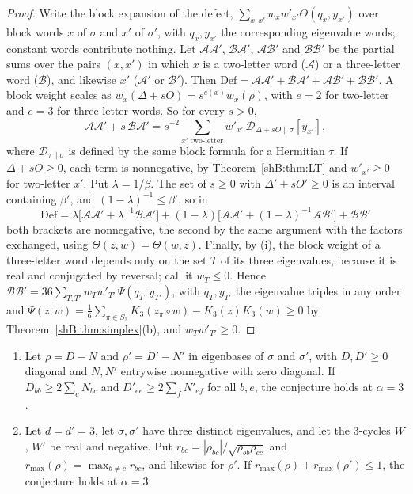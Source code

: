 \begin{proof}
Write the block expansion of the defect, $\sum_{x,x'}w_xw'_{x'}\Theta(q_x,y_{x'})$ over block words $x$ of $\sigma$ and $x'$ of $\sigma'$, with $q_x,y_{x'}$ the corresponding eigenvalue words; constant words contribute nothing. Let $\mathcal A\mathcal A'$, $\mathcal B\mathcal A'$, $\mathcal A\mathcal B'$ and $\mathcal B\mathcal B'$ be the partial sums over the pairs $(x,x')$ in which $x$ is a two-letter word ($\mathcal A$) or a three-letter word ($\mathcal B$), and likewise $x'$ ($\mathcal A'$ or $\mathcal B'$). Then $\mathrm{Def}=\mathcal A\mathcal A'+\mathcal B\mathcal A'+\mathcal A\mathcal B'+\mathcal B\mathcal B'$. A block weight scales as $w_x(\Delta+sO)=s^{e(x)}w_x(\rho)$, with $e=2$ for two-letter and $e=3$ for three-letter words. So for every $s>0$,
\[
\mathcal A\mathcal A'+s\,\mathcal B\mathcal A'=s^{-2}\sum_{x'\ \text{two-letter}}w'_{x'}\,\mathcal D_{\Delta+sO\|\sigma}[y_{x'}],
\]
where $\mathcal D_{\tau\|\sigma}$ is defined by the same block formula for a Hermitian $\tau$. If $\Delta+sO\ge0$, each term is nonnegative, by Theorem~\ref{shB:thm:LT} and $w'_{x'}\ge0$ for two-letter $x'$. Put $\lambda=1/\beta$. The set of $s\ge0$ with $\Delta'+sO'\ge0$ is an interval containing $\beta'$, and $(1-\lambda)^{-1}\le\beta'$, so in
\[
\mathrm{Def}=\lambda\big[\mathcal A\mathcal A'+\lambda^{-1}\mathcal B\mathcal A'\big]+(1-\lambda)\big[\mathcal A\mathcal A'+(1-\lambda)^{-1}\mathcal A\mathcal B'\big]+\mathcal B\mathcal B'
\]
both brackets are nonnegative, the second by the same argument with the factors exchanged, using $\Theta(z,w)=\Theta(w,z)$. Finally, by (i), the block weight of a three-letter word depends only on the set $T$ of its three eigenvalues, because it is real and conjugated by reversal; call it $w_T\le0$. Hence $\mathcal B\mathcal B'=36\sum_{T,T'}w_Tw'_{T'}\,\Psi(q_T;y_{T'})$, with $q_T,y_{T'}$ the eigenvalue triples in any order and $\Psi(z;w)=\frac16\sum_{\pi\in S_3}K_3(z_\pi\circ w)-K_3(z)K_3(w)\ge0$ by Theorem~\ref{shB:thm:simplex}(b), and $w_Tw'_{T'}\ge0$.
\end{proof}

\begin{corollary}\label{shB:cor:negative}
\begin{enumerate}[label=(\alph*)]
\item Let $\rho=D-N$ and $\rho'=D'-N'$ in eigenbases of $\sigma$ and $\sigma'$, with $D,D'\ge0$ diagonal and $N,N'$ entrywise nonnegative with zero diagonal. If $D_{bb}\ge2\sum_cN_{bc}$ and $D'_{ee}\ge2\sum_fN'_{ef}$ for all $b,e$, the conjecture holds at $\alpha=3$.
\item Let $d=d'=3$, let $\sigma,\sigma'$ have three distinct eigenvalues, and let the $3$-cycles $W$, $W'$ be real and negative. Put $r_{bc}=|\rho_{bc}|/\sqrt{\rho_{bb}\rho_{cc}}$ and $r_{\max}(\rho)=\max_{b\ne c}r_{bc}$, and likewise for $\rho'$. If $r_{\max}(\rho)+r_{\max}(\rho')\le1$, the conjecture holds at $\alpha=3$.
\end{enumerate}
\end{corollary}

